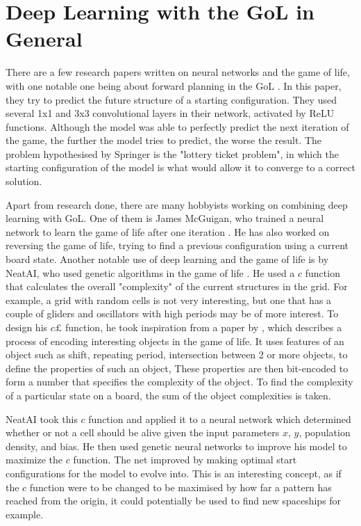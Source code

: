 \documentclass{l4proj}
\begin{document}
\section{Deep Learning with the GoL in General}

There are a few research papers written on neural networks and the game of life, with one notable one being about forward planning in the GoL \citep{game_of_life_dl_is_hard}. In this paper, they try to predict the future structure of a starting configuration. They used several 1x1 and 3x3 convolutional layers in their network, activated by ReLU functions. Although the model was able to perfectly predict the next iteration of the game, the further the model tries to predict, the worse the result. The problem hypothesised by Springer is the "lottery ticket problem", in which the starting configuration of the model is what would allow it to converge to a correct solution. 

Apart from research done, there are many hobbyists working on combining deep learning with GoL. One of them is James McGuigan, who trained a neural network to learn the game of life after one iteration \citep{james}. He has also worked on reversing the game of life, trying to find a previous configuration using a current board state. Another notable use of deep learning and the game of life is by NeatAI, who used genetic algorithms in the game of life \citep{neatai_gol}. He used a $c$ function that calculates the overall "complexity" of the current structures in the grid. For example, a grid with random cells is not very interesting, but one that has a couple of gliders and oscillators with high periods may be of more interest. To design his $c£$ function, he took inspiration from a paper by \citep{algorithmic_specified_complexity}, which describes a process of encoding interesting objects in the game of life. It uses features of an object such as shift, repeating period, intersection between 2 or more objects, to define the properties of such an object, These properties are then bit-encoded to form a number that specifies the complexity of the object. To find the complexity of a particular state on a board, the sum of the object complexities is taken.

NeatAI took this $c$ function and applied it to a neural network which determined whether or not a cell should be alive given the input parameters $x$, $y$, population density, and bias. He then used genetic neural networks to improve his model to maximize the $c$ function. The net improved by making optimal start configurations for the model to evolve into. This is an interesting concept, as if the $c$ function were to be changed to be maximised by how far a pattern has reached from the origin, it could potentially be used to find new spaceships for example.
\end{document}

